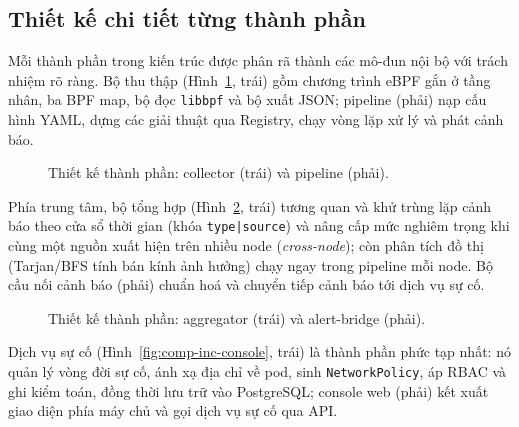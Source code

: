 \subsection{Thiết kế chi tiết từng thành phần}
\label{subsec:per-app}

Mỗi thành phần trong kiến trúc được phân rã thành các mô-đun nội bộ với trách nhiệm rõ
ràng. Bộ thu thập (Hình~\ref{fig:comp-collect-pipe}, trái) gồm chương trình eBPF gắn ở
tầng nhân, ba BPF map, bộ đọc \texttt{libbpf} và bộ xuất JSON; pipeline (phải) nạp cấu
hình YAML, dựng các giải thuật qua Registry, chạy vòng lặp xử lý và phát cảnh báo.

\begin{figure}[H]
  \centering
  \begin{minipage}{0.48\linewidth}\centering\resizebox{\linewidth}{!}{}\end{minipage}\hfill
  \begin{minipage}{0.48\linewidth}\centering\resizebox{\linewidth}{!}{}\end{minipage}
  \caption{Thiết kế thành phần: collector (trái) và pipeline (phải).}
  \label{fig:comp-collect-pipe}
\end{figure}

Phía trung tâm, bộ tổng hợp (Hình~\ref{fig:comp-agg-bridge}, trái) tương quan và khử
trùng lặp cảnh báo theo cửa sổ thời gian (khóa \texttt{type|source}) và nâng cấp mức
nghiêm trọng khi cùng một nguồn xuất hiện trên nhiều node (\emph{cross-node}); còn phân
tích đồ thị (Tarjan/BFS tính bán kính ảnh hưởng) chạy ngay trong pipeline mỗi node. Bộ
cầu nối cảnh báo (phải) chuẩn hoá và chuyển tiếp cảnh báo tới dịch vụ sự cố.

\begin{figure}[H]
  \centering
  \begin{minipage}{0.48\linewidth}\centering\resizebox{\linewidth}{!}{}\end{minipage}\hfill
  \begin{minipage}{0.48\linewidth}\centering\resizebox{\linewidth}{!}{}\end{minipage}
  \caption{Thiết kế thành phần: aggregator (trái) và alert-bridge (phải).}
  \label{fig:comp-agg-bridge}
\end{figure}

Dịch vụ sự cố (Hình~\ref{fig:comp-inc-console}, trái) là thành phần phức tạp nhất: nó
quản lý vòng đời sự cố, ánh xạ địa chỉ về pod, sinh \texttt{NetworkPolicy}, áp RBAC và ghi
kiểm toán, đồng thời lưu trữ vào PostgreSQL; console web (phải) kết xuất giao diện phía
máy chủ và gọi dịch vụ sự cố qua API.

